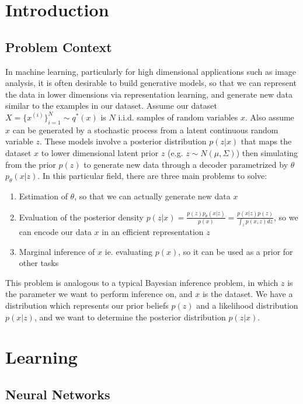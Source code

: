 \documentclass[a4paper,12pt]{article}
\numberwithin{equation}{section}
\begin{document}
\tableofcontents
\newpage
\section{Introduction}
\subsection{Problem Context}
In machine learning, particularly for high dimensional applications such as image analysis, it is often desirable to build generative models, so that we can represent the data in lower dimensions via representation learning, and generate new data similar to the examples in our dataset. Assume our dataset $X=\{x^{(i)}\}^N_{i=1}\sim q^*(x)$ is $N$ i.i.d. samples of random variables $x$. Also assume $x$ can be generated by a stochastic process from a latent continuous random variable $z$. These models involve a posterior distribution $p(z|x)$ that maps the dataset $x$ to lower dimensional latent prior $z$ (e.g. $z\sim N(\mu,\Sigma)$) then simulating from the prior $p(z)$ to generate new data through a decoder parametrized by $\theta$ $p_\theta(x|z)$. In this particular field, there are three main problems to solve:
\begin{enumerate}
\item Estimation of $\theta$, so that we can actually generate new data $x$
\item Evaluation of the posterior density $p(z|x) = \frac{p(z)p_\theta(x|z)}{p(x)} = \frac{p(x|z)p(z)}{\int_z p(x,z)dz}$, so we can encode our data $x$ in an efficient representation $z$
\item Marginal inference of $x$ ie. evaluating $p(x)$, so it can be used as a prior for other tasks
\end{enumerate}
This problem is analogous to a typical Bayesian inference problem, in which $z$ is the parameter we want to perform inference on, and $x$ is the dataset. We have a distribution which represents our prior beliefs $p(z)$ and a likelihood distribution $p(x|z)$, and we want to determine the posterior distribution $p(z|x)$.
\newpage
\section{Learning}
\subsection{Neural Networks}
\end{document}
